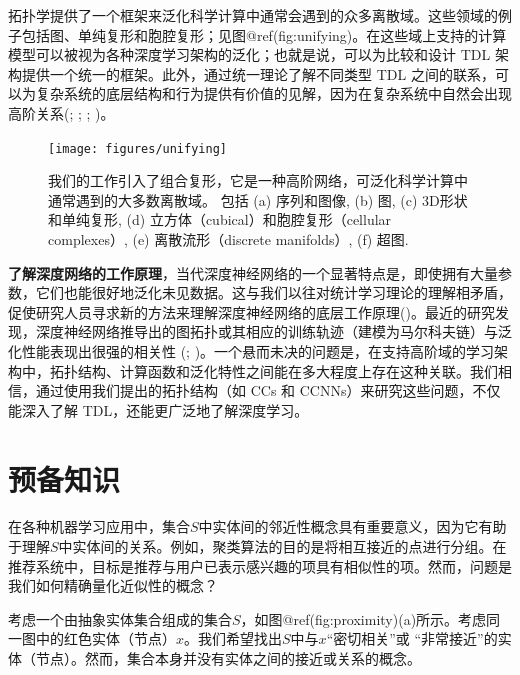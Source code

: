 \documentclass[
  12pt,
]{krantz}
\begin{document}
拓扑学提供了一个框架来泛化科学计算中通常会遇到的众多离散域。这些领域的例子包括图、单纯复形和胞腔复形；见图@ref(fig:unifying)。在这些域上支持的计算模型可以被视为各种深度学习架构的泛化；也就是说，可以为比较和设计
TDL 架构提供一个统一的框架。此外，通过统一理论了解不同类型 TDL
之间的联系，可以为复杂系统的底层结构和行为提供有价值的见解，因为在复杂系统中自然会出现高阶关系(; ; ;
)。

\begin{figure}

{\centering \texttt{[image: figures/unifying]} 

}

\caption{我们的工作引入了组合复形，它是一种高阶网络，可泛化科学计算中通常遇到的大多数离散域。 包括 (a) 序列和图像, (b) 图, (c) 3D形状和单纯复形, (d) 立方体（cubical）和胞腔复形（cellular complexes）, (e) 离散流形（discrete manifolds）, (f) 超图.}\label{fig:unifying}
\end{figure}

\textbf{了解深度网络的工作原理}，当代深度神经网络的一个显著特点是，即使拥有大量参数，它们也能很好地泛化未见数据。这与我们以往对统计学习理论的理解相矛盾，促使研究人员寻求新的方法来理解深度神经网络的底层工作原理()。最近的研究发现，深度神经网络推导出的图拓扑或其相应的训练轨迹（建模为马尔科夫链）与泛化性能表现出很强的相关性
(;
)。一个悬而未决的问题是，在支持高阶域的学习架构中，拓扑结构、计算函数和泛化特性之间能在多大程度上存在这种关联。我们相信，通过使用我们提出的拓扑结构（如
CCs 和 CCNNs）来研究这些问题，不仅能深入了解
TDL，还能更广泛地了解深度学习。

\section{预备知识}\label{preliminaries}

在各种机器学习应用中，集合\(S\)中实体间的邻近性概念具有重要意义，因为它有助于理解\(S\)中实体间的关系。例如，聚类算法的目的是将相互接近的点进行分组。在推荐系统中，目标是推荐与用户已表示感兴趣的项具有相似性的项。然而，问题是我们如何精确量化近似性的概念？

考虑一个由抽象实体集合组成的集合\(S\)，如图@ref(fig:proximity)(a)所示。考虑同一图中的红色实体（节点）\(x\)。我们希望找出\(S\)中与\(x\)``密切相关''或
``非常接近''的实体（节点）。然而，集合本身并没有实体之间的接近或关系的概念。
\end{document}
